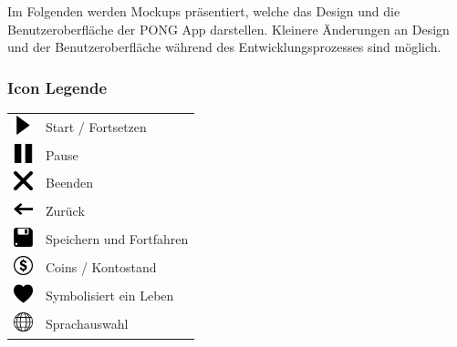 Im Folgenden werden Mockups präsentiert, welche das Design und die Benutzeroberfläche der PONG App darstellen. Kleinere Änderungen an Design und der Benutzeroberfläche während des Entwicklungsprozesses sind möglich.

\subsubsection{Icon Legende}
\vspace*{0.5cm}

\begin{center}
    \begin{tabular}{ll}
        \includegraphics[width=1.5em,height=1.5em]{diagramme/assets/Media-Play-256.png} & Start / Fortsetzen \\
        \includegraphics[width=1.5em,height=1.5em]{diagramme/assets/Media-Pause-256.png} & Pause \\
        \includegraphics[width=1.5em,height=1.5em]{diagramme/assets/Close-256.png} & Beenden\\
        \includegraphics[width=1.5em,height=1.5em]{diagramme/assets/Arrow-Left-05-256.png} & Zurück \\
        \includegraphics[width=1.5em,height=1.5em]{diagramme/assets/Floppy-256.png} & Speichern und Fortfahren \\
        \includegraphics[width=1.5em,height=1.5em]{diagramme/assets/Money-Coin-02-WF-256.png} & Coins / Kontostand \\
        \includegraphics[width=1.5em,height=1.5em]{diagramme/assets/Heart-256.png} & Symbolisiert ein Leben \\
        \includegraphics[width=1.5em,height=1.5em]{diagramme/assets/Globe-256.png} & Sprachauswahl \\

\end{tabular}
\end{center}
